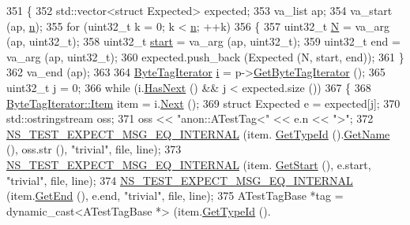\begin{DoxyCode}
351 \{
352   std::vector<struct Expected> expected;
353   va\_list ap;
354   va\_start (ap, \hyperlink{namespacesample-rng-plot_aeb5ee5c431e338ef39b7ac5431242e1d}{n});
355   \textcolor{keywordflow}{for} (uint32\_t k = 0; k < \hyperlink{namespacesample-rng-plot_aeb5ee5c431e338ef39b7ac5431242e1d}{n}; ++k)
356     \{
357       uint32\_t \hyperlink{loss__ITU1238_8m_aaa6c78b1d659f53598dbe891c1139b3e}{N} = va\_arg (ap, uint32\_t);
358       uint32\_t \hyperlink{namespacevisualizer_1_1core_a2a35e5d8a34af358b508dac8635754e0}{start} = va\_arg (ap, uint32\_t);
359       uint32\_t end = va\_arg (ap, uint32\_t);
360       expected.push\_back (Expected (N, start, end));
361     \}
362   va\_end (ap);
363 
364   \hyperlink{classns3_1_1ByteTagIterator}{ByteTagIterator} \hyperlink{bernuolliDistribution_8m_a6f6ccfcf58b31cb6412107d9d5281426}{i} = p->\hyperlink{classns3_1_1Packet_a3c03f35c267e8534c29bdaa4686e4823}{GetByteTagIterator} ();
365   uint32\_t j = 0;
366   \textcolor{keywordflow}{while} (i.\hyperlink{classns3_1_1ByteTagIterator_a1337834aa5fbb23a982fe521e54fb78a}{HasNext} () && j < expected.size ())
367     \{
368       \hyperlink{classns3_1_1ByteTagIterator_1_1Item}{ByteTagIterator::Item} item = i.\hyperlink{classns3_1_1ByteTagIterator_af2fa25a08fe0a868ab051e3c4bfcad01}{Next} ();
369       \textcolor{keyword}{struct }Expected e = expected[j];
370       std::ostringstream oss;
371       oss << \textcolor{stringliteral}{"anon::ATestTag<"} << e.n << \textcolor{stringliteral}{">"};
372       \hyperlink{group__testingimpl_gaf35a8f7e8a9a1eb011fa6fb33ea721a3}{NS\_TEST\_EXPECT\_MSG\_EQ\_INTERNAL} (item.
      \hyperlink{classns3_1_1ByteTagIterator_1_1Item_aaae5fe08c2b67ac485faa4372fe38cea}{GetTypeId} ().\hyperlink{classns3_1_1TypeId_aa3c41c79ae428b3cb396a9c6bb3ef314}{GetName} (), oss.str (), \textcolor{stringliteral}{"trivial"}, file, line);
373       \hyperlink{group__testingimpl_gaf35a8f7e8a9a1eb011fa6fb33ea721a3}{NS\_TEST\_EXPECT\_MSG\_EQ\_INTERNAL} (item.
      \hyperlink{classns3_1_1ByteTagIterator_1_1Item_abaf7c97dec29431934732d656361d13c}{GetStart} (), e.start, \textcolor{stringliteral}{"trivial"}, file, line);
374       \hyperlink{group__testingimpl_gaf35a8f7e8a9a1eb011fa6fb33ea721a3}{NS\_TEST\_EXPECT\_MSG\_EQ\_INTERNAL} (item.\hyperlink{classns3_1_1ByteTagIterator_1_1Item_a47e206d7530bd378c26a55f206deefea}{GetEnd} (), e.end, \textcolor{stringliteral}{"trivial"},
       file, line);
375       ATestTagBase *tag = \textcolor{keyword}{dynamic\_cast<}ATestTagBase *\textcolor{keyword}{>} (item.\hyperlink{classns3_1_1ByteTagIterator_1_1Item_aaae5fe08c2b67ac485faa4372fe38cea}{GetTypeId} ().

\end{DoxyCode}
